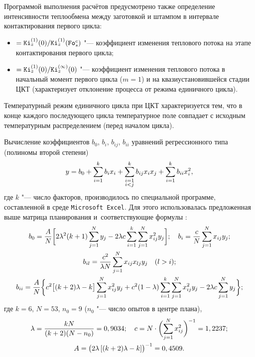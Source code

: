 Программой выполнения расчётов  предусмотрено также определение интенсивности теплообмена между заготовкой и штампом в
интервале контактирования первого цикла: 
\begin{itemize}

\item[$y_{12}$]  $={\tt Ki}_z^{(1)} (0)/{\tt Ki}_z^{(1)} ({\tt Fo}_s^c )$ "--- коэффициент изменения теплового потока на этапе контактирования первого цикла; 

\item[$y_{13}$] $={\tt Ki}_z^{(1)} (0)/{\tt Ki}_z^{(\infty )} (0)$ "--- коэффициент изменения теплового потока в начальный момент первого цикла ($m = 1$) и на квазиустановившейся стадии ЦКТ (характеризует отклонение процесса от режима единичного цикла).
\end{itemize}

Температурный режим единичного цикла при ЦКТ характеризуется тем,
что в конце каждого последующего цикла температурное поле
совпадает с исходным температурным распределением (перед началом
цикла).

Вычисление коэффициентов $b_0$, $b_i$, $b_{ij}$, $b_{ii}$ уравнений
регрессионного типа (полиномы второй степени)
\begin{equation}
\label{stulin:eq9}
y=b_0 +\sum\limits_{i=1}^k b_i x_i +
\sum\limits_{\begin{subarray}{l}
 i=1 \\
 i<j \\
 \end{subarray}}^k b_{ij} x_i x_j + \sum\limits_{i=1}^k b_{ii} x_i^2,
\end{equation}
где $k$ "--- число факторов, производилось по специальной программе, составленной в среде {\tt Microsoft Excel}. Для
этого использовалась предложенная выше матрица планирования и~соответствующие формулы \cite{stulin:bib5}:
\begin{gather}
\notag
b_0 =\frac{A}{N}\biggl[2\lambda
^2(k+1)\sum\limits_{j=1}^N y_j -2\lambda c\sum\limits_{i=1}^k
\sum\limits_{j=1}^N x_{ij}^2 y_j  \biggr]; \quad b_i
=\frac{c}{N} \sum\limits_{j=1}^N x_{ij} y_j; \\
\label{stulin:eq10}
b_{il} =\frac{c^2}{\lambda N}\sum\limits_{j=1}^N x_{ij} x_{lj} y_j
\quad (l>i); \\
\label{stulin:eq11} b_{ii} =\frac{A}{N}\biggl\{ c^2\bigl[
(k+2)\lambda -k \bigr]\sum\limits_{j=1}^N x_{ij}^2 y_j
+c^2(1-\lambda )\sum\limits_{i=1}^k \sum\limits_{j=1}^N x_{ij}^2
y_j -2\lambda c\sum\limits_{j=1}^N y_j \biggr\};
\end{gather}
где $k=6$, $N=53$, $n_0 =9$ ($n_0$ "--- число опытов в центре плана),
\begin{gather}
\notag
\lambda =\frac{kN}{(k+2)(N-n_0 )}=0,9034;\quad
c=N\cdot \biggl(\sum\limits_{j=1}^N x_{ij}^2 \biggr)^{-1}
=1,2237;\\
\label{stulin:eq12}
A=\bigl({2\lambda \left[ (k+2)\lambda -k
\right]}\bigr)^{-1}=0,4509.
\end{gather}

